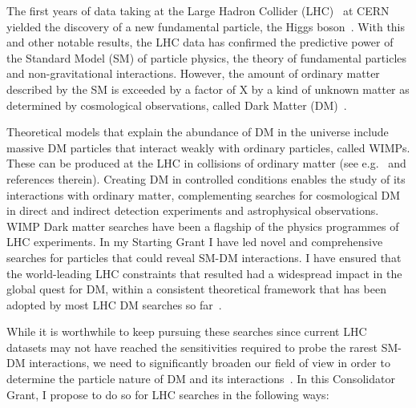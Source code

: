 \documentclass[11pt,a4paper]{article}
\begin{document}
The first years of data taking at the Large Hadron Collider (LHC)~\cite{LHC2008} at CERN yielded the discovery of a new fundamental particle, the Higgs boson~\cite{Khachatryan:2016vau}. With this and other notable results, the LHC data has confirmed the predictive power of the Standard Model (SM) of particle physics, the theory of fundamental particles and non-gravitational interactions. However, the amount of ordinary matter described by the SM is exceeded by a factor of X by a kind of unknown matter as determined by cosmological observations, called Dark Matter (DM)~\cite{Bertone:2016nfn}. 


Theoretical models that explain the abundance of DM in the universe include massive DM particles that interact weakly with ordinary particles, called WIMPs. These can be produced at the LHC in collisions of ordinary matter (see e.g.~\cite{Boveia:2018yeb} and references therein). 
Creating DM in controlled conditions enables the study of its interactions with ordinary matter, complementing searches for cosmological DM in direct and indirect detection experiments and astrophysical observations. %
WIMP Dark matter searches have been a flagship of the physics programmes of LHC experiments. In my Starting Grant I have led novel and comprehensive searches for particles that could reveal SM-DM interactions. I have ensured that the world-leading LHC constraints that resulted had a widespread impact in the global quest for DM, within a consistent theoretical framework that has been adopted by most LHC DM searches so far~\cite{DMWG}.  

While it is worthwhile to keep pursuing these searches since current LHC datasets may not have reached the sensitivities required to probe the rarest SM-DM interactions, we need to significantly broaden our field of view in order to determine the particle nature of DM and its interactions~\cite{Bertone:2018xtm}. In this Consolidator Grant, I propose to do so for LHC searches in the following ways:
\end{document}
